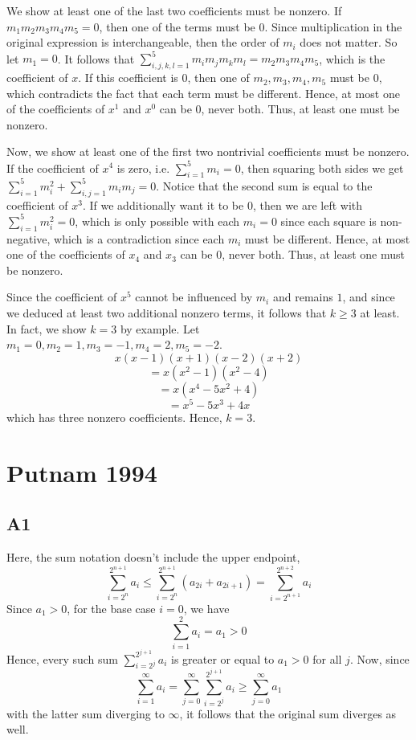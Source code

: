 \documentclass{book}
\begin{document}
We show at least one of the last two coefficients must be nonzero. If $m_1m_2m_3m_4m_5 = 0$, then one of the terms must be $0$. Since multiplication in the original expression is interchangeable, then the order of $m_i$ does not matter. So let $m_1 = 0$. It follows that $\sum_{i, j, k, l = 1}^5 m_i m_j m_k m_l = m_2m_3m_4m_5$, which is the coefficient of $x$. If this coefficient is $0$, then one of $m_2, m_3, m_4, m_5$ must be $0$, which contradicts the fact that each term must be different. Hence, at most one of the coefficients of $x^1$ and $x^0$ can be $0$, never both. Thus, at least one must be nonzero.

Now, we show at least one of the first two nontrivial coefficients must be nonzero. If the coefficient of $x^4$ is zero, i.e. $\sum_{i = 1}^5 m_i = 0$, then squaring both sides we get $\sum_{i = 1}^5 m_i^2 + \sum_{i, j = 1}^5 m_i m_j = 0$. Notice that the second sum is equal to the coefficient of $x^3$. If we additionally want it to be $0$, then we are left with $\sum_{i = 1}^5 m_i^2 = 0$, which is only possible with each $m_i = 0$ since each square is non-negative, which is a contradiction since each $m_i$ must be different. Hence, at most one of the coefficients of $x_4$ and $x_3$ can be $0$, never both. Thus, at least one must be nonzero.

Since the coefficient of $x^5$ cannot be influenced by $m_i$ and remains $1$, and since we deduced at least two additional nonzero terms, it follows that $k \geq 3$ at least. In fact, we show $k = 3$ by example. Let $m_1 = 0, m_2 = 1, m_3 = -1, m_4 = 2, m_5 = -2$.
$$x(x - 1)(x + 1)(x - 2)(x + 2)$$
$$= x(x^2 - 1)(x^2 - 4)$$
$$= x(x^4 - 5x^2 + 4)$$
$$= x^5 - 5x^3 + 4x$$
which has three nonzero coefficients. Hence, $k = 3$.

\chapter{Putnam 1994}

\section*{A1}
Here, the sum notation doesn't include the upper endpoint,
$$
\sum_{i = 2^n}^{2^{n + 1}} a_i \leq
\sum_{i = 2^n}^{2^{n + 1}} (a_{2i} + a_{2i + 1}) =
\sum_{i = 2^{n + 1}}^{2^{n + 2}} a_i$$
Since $a_1 > 0$, for the base case $i = 0$, we have
$$\sum_{i = 1}^2 a_i = a_1 > 0$$
Hence, every such sum $\sum_{i = 2^j}^{2^{j + 1}} a_i$ is greater or equal to $a_1 > 0$ for all $j$. Now, since
$$\sum_{i = 1}^\infty a_i = \sum_{j = 0}^\infty \sum_{i = 2^j}^{2^{j + 1}} a_i \geq \sum_{j = 0}^\infty a_1$$
with the latter sum diverging to $\infty$, it follows that the original sum diverges as well.
\end{document}

